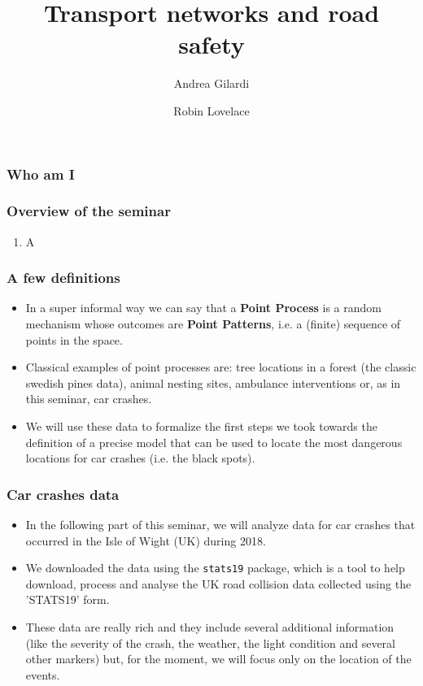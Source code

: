 \documentclass[c,10pt,pdftex]{beamer}
\title{Transport networks and road safety}
\author{Andrea Gilardi \inst{1} \and Robin Lovelace \inst{2}}
\institute{\inst{1} University of Milan - Bicocca \and \inst{2} University of Leeds - ITS}
\begin{document}
\inserttitlepage

\begin{frame}
\frametitle{Who am I}
\end{frame}

\begin{frame}
\frametitle{Overview of the seminar}
\begin{enumerate}
	\item A
\end{enumerate}
\end{frame}

\begin{frame}
\frametitle{A few definitions}
\vspace{-0.75cm}
\begin{itemize}
	\setlength\itemsep{1em}
	\item In a super informal way we can say that a \textbf{Point Process} is a random mechanism whose outcomes are \textbf{Point Patterns}, i.e. a (finite) sequence of points in the space. 
	
	\item Classical examples of point processes are: tree locations in a forest (the classic swedish pines data), animal nesting sites, ambulance interventions or, as  in this seminar, car crashes. 
	
	\item We will use these data to formalize the first steps we took towards the definition of a precise model that can be used to locate the most dangerous locations for car crashes (i.e. the black spots). 
\end{itemize}
\end{frame}

\begin{frame}
\frametitle{Car crashes data}
\vspace{-0.75cm}
\begin{itemize}
	\setlength\itemsep{1em}
	\item In the following part of this seminar, we will analyze data for car crashes that occurred in the Isle of Wight (UK) during 2018. 
	
	\item We downloaded the data using the \texttt{stats19} package, which is a tool to help download, process and analyse the UK road collision data collected using the 'STATS19' form. 
	
	\item These data are really rich and they include several additional information (like the severity of the crash, the weather, the light condition and several other markers) but, for the moment, we will focus only on the location of the events. 
\end{itemize}
\end{frame}
\end{document}

